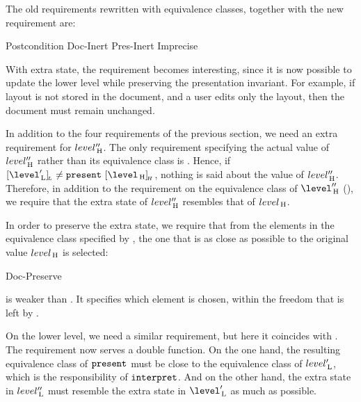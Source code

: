 The old requirements rewritten with equivalence classes, together with the new requirement are:

		{Postcondition}
  {Doc-Inert}
		{Pres-Inert}
	{Imprecise}

With extra state, the  requirement becomes interesting, since it is now possible to update the lower level while preserving the presentation invariant. For example, if layout is not stored in the document, and a user edits only the layout, then the document must remain unchanged.

In addition to the four requirements of the previous section, we need an extra requirement for $level''_{\, \mathrm H}$. The only requirement specifying the actual value of $level''_{\, \mathrm H}$ rather than its equivalence class is . Hence, if 
$\eqcl{\level'\L}{L} \neq \present~\eqcl{\level\H}{H}$, nothing is said about the value of $level''_{\, \mathrm H}$. Therefore, in addition to the requirement on the  equivalence class of $\level''\H$ (), we require that the extra state of $level''_{\, \mathrm H}$ resembles that of $level_{\, \mathrm H}$. 

In order to preserve the extra state, we require that from the elements in the equivalence class specified by , the one that is as close as possible to the original value $level_{\, \mathrm H}$ is selected:

	{Doc-Preserve}

 is weaker than . It specifies which element is chosen, within the freedom that is left by .

On the lower level, we need a similar requirement, but here it coincides with . The  requirement now serves a double function. On the one hand, the resulting equivalence class of ${\tt present}$ must be close to the equivalence class of $level'_{\, \mathrm L}$, which is the responsibility of ${\tt interpret}$. And on the other hand, the extra state in $level''_{\, \mathrm L}$ must resemble the extra state in $\level'\L$ as much as possible.



